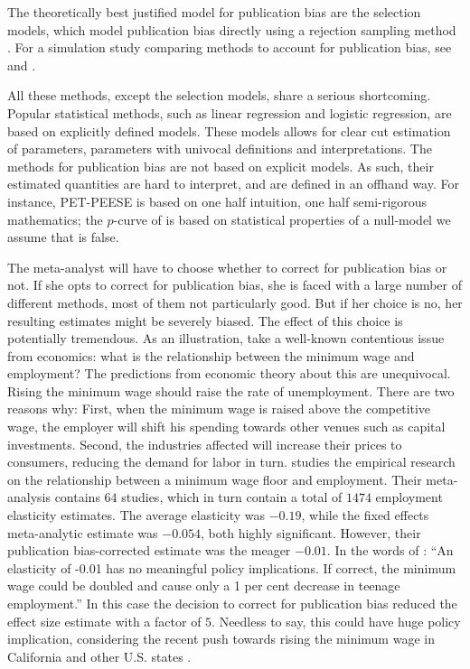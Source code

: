 The theoretically best justified model for publication bias are the selection models, which model publication bias directly using a rejection sampling method \textcite{Hedges1992-ue}. For a simulation study comparing methods to account for publication bias, see \textcite{moreno_assessment_2009} and \textcite{Carter2019-rw}.

All these methods, except the selection models, share a serious shortcoming. Popular statistical methods, such as linear regression and logistic regression, are based on explicitly defined models. These models allows for clear cut estimation of parameters, parameters with univocal definitions and interpretations. The methods for publication bias are not based on explicit models. As such, their estimated quantities are hard to interpret, and are defined in an offhand way. For instance, PET-PEESE is based on one half intuition, one half semi-rigorous mathematics; the $p$-curve of is based on statistical properties of a null-model we assume that is false. 

The meta-analyst will have to choose whether to correct for publication bias or not. If she opts to correct for publication bias, she is faced with a large number of different methods, most of them not particularly good. But if her choice is no, her resulting estimates might be severely biased. The effect of this choice is potentially tremendous. As an illustration, take a well-known contentious issue from economics: what is the relationship between the minimum wage and employment? The predictions from economic theory about this are unequivocal. Rising the minimum wage should raise the rate of unemployment. There are two reasons why: First, when the minimum wage is raised above the competitive wage, the employer will shift his spending towards other venues such as capital investments. Second, the industries affected will increase their prices to consumers, reducing the demand for labor in turn. \textcite{doucouliagos_publication_2009} studies the empirical research on the relationship between a minimum wage floor and employment. Their meta-analysis contains $64$ studies, which in turn contain a total of $1474$ employment elasticity estimates. The average elasticity was $-0.19$, while the fixed effects meta-analytic estimate was $-0.054$, both highly significant. However, their publication bias-corrected estimate was the meager $-0.01$. In the words of \textcite{doucouliagos_publication_2009}: ``An elasticity of -0.01 has no meaningful policy implications. If correct, the minimum wage could be doubled and cause only a 1 per cent decrease in teenage employment.'' In this case the decision to correct for publication bias reduced the effect size estimate with a factor of $5$. Needless to say, this could have huge policy implication, considering the recent push towards rising the minimum wage in California and other U.S. states \parencite{Lee2016-bd}.

